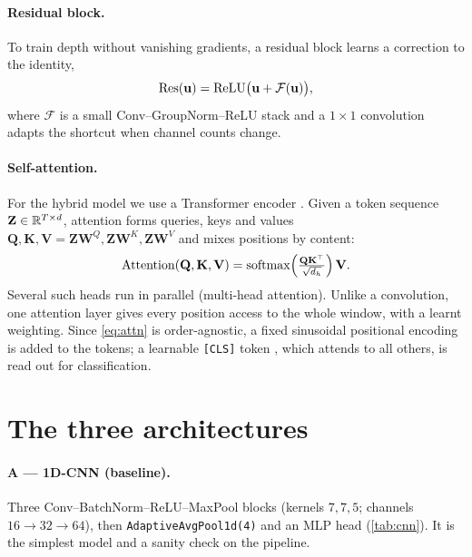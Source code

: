 \paragraph{Residual block.} To train depth without vanishing gradients, a
residual block \cite{he2016deep} learns a correction to the identity,
\begin{equation}
    \mathrm{Res}(\mathbf{u}) = \operatorname{ReLU}\!\big(\mathbf{u} + \mathcal{F}(\mathbf{u})\big),
    \label{eq:res}
\end{equation}
where $\mathcal{F}$ is a small Conv--GroupNorm--ReLU stack and a $1{\times}1$
convolution adapts the shortcut when channel counts change.

\paragraph{Self-attention.} For the hybrid model we use a Transformer encoder
\cite{vaswani2017attention}. Given a token sequence $\mathbf{Z}\in\mathbb{R}^{T\times d}$,
attention forms queries, keys and values
$\mathbf{Q},\mathbf{K},\mathbf{V}=\mathbf{Z}\mathbf{W}^{Q},\mathbf{Z}\mathbf{W}^{K},\mathbf{Z}\mathbf{W}^{V}$
and mixes positions by content:
\begin{equation}
    \operatorname{Attention}(\mathbf{Q},\mathbf{K},\mathbf{V})
    = \operatorname{softmax}\!\Big(\tfrac{\mathbf{Q}\mathbf{K}^{\top}}{\sqrt{d_h}}\Big)\,\mathbf{V}.
    \label{eq:attn}
\end{equation}
Several such heads run in parallel (multi-head attention). Unlike a convolution,
one attention layer gives every position access to the whole window, with a
learnt weighting. Since \cref{eq:attn} is order-agnostic, a fixed sinusoidal
positional encoding is added to the tokens; a learnable \texttt{[CLS]} token
\cite{devlin2019bert}, which attends to all others, is read out for
classification.

\section{The three architectures}
\label{sec:arch}

\paragraph{A --- 1D-CNN (baseline).} Three Conv--BatchNorm--ReLU--MaxPool blocks
(kernels $7,7,5$; channels $16\!\to\!32\!\to\!64$), then
\texttt{AdaptiveAvgPool1d(4)} and an MLP head (\cref{tab:cnn}). It is the
simplest model and a sanity check on the pipeline.

